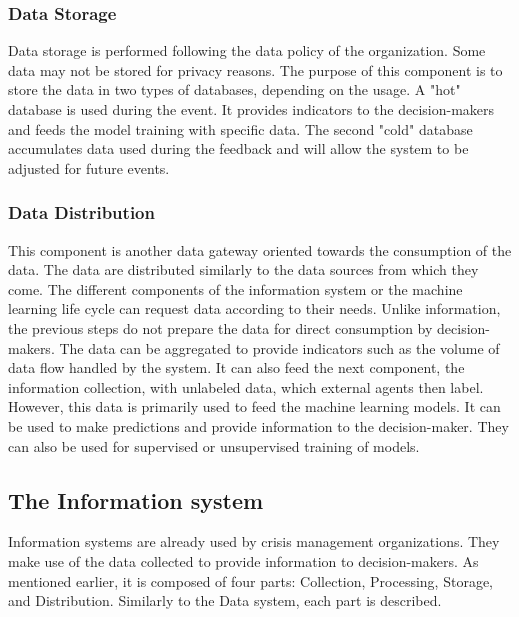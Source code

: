 \subsubsection{Data Storage}
Data storage is performed following the data policy of the organization.
Some data may not be stored for privacy reasons.
The purpose of this component is to store the data in two types of databases, depending on the usage.
A "hot" database is used during the event.
It provides indicators to the decision-makers and feeds the model training with specific data.
The second "cold" database accumulates data used during the feedback and will allow the system to be adjusted for future events.

\subsubsection{Data Distribution}
This component is another data gateway oriented towards the consumption of the data.
The data are distributed similarly to the data sources from which they come.
The different components of the information system or the machine learning life cycle can request data according to their needs.
Unlike information, the previous steps do not prepare the data for direct consumption by decision-makers.
The data can be aggregated to provide indicators such as the volume of data flow handled by the system.
It can also feed the next component, the information collection, with unlabeled data, which external agents then label.
However, this data is primarily used to feed the machine learning models.
It can be used to make predictions and provide information to the decision-maker.
They can also be used for supervised or unsupervised training of models.

\subsection{The Information system}
Information systems are already used by crisis management organizations.
They make use of the data collected to provide information to decision-makers.
As mentioned earlier, it is composed of four parts: Collection, Processing, Storage, and Distribution.
Similarly to the Data system, each part is described.

